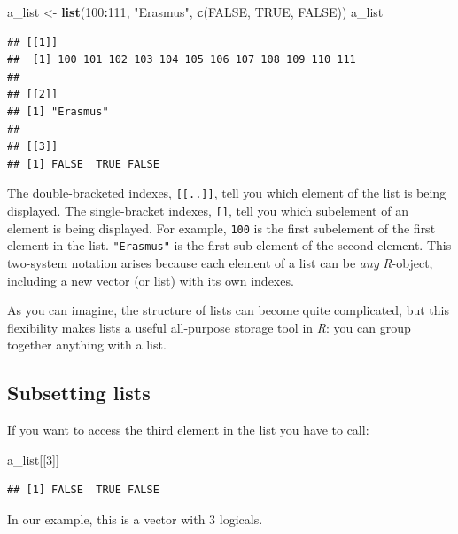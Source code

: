 \documentclass[
]{scrartcl}
\newenvironment{Shaded}{\begin{snugshade}}{\end{snugshade}}
\newcommand{\DecValTok}[1]{\textcolor[rgb]{0.00,0.00,0.81}{#1}}
\newcommand{\KeywordTok}[1]{\textcolor[rgb]{0.13,0.29,0.53}{\textbf{#1}}}
\newcommand{\NormalTok}[1]{#1}
\newcommand{\OperatorTok}[1]{\textcolor[rgb]{0.81,0.36,0.00}{\textbf{#1}}}
\newcommand{\OtherTok}[1]{\textcolor[rgb]{0.56,0.35,0.01}{#1}}
\newcommand{\StringTok}[1]{\textcolor[rgb]{0.31,0.60,0.02}{#1}}
\begin{document}
\begin{Shaded}
\begin{Highlighting}[]
\NormalTok{a\_list \textless{}{-}}\StringTok{ }\KeywordTok{list}\NormalTok{(}\DecValTok{100}\OperatorTok{:}\DecValTok{111}\NormalTok{, }\StringTok{"Erasmus"}\NormalTok{, }\KeywordTok{c}\NormalTok{(}\OtherTok{FALSE}\NormalTok{, }\OtherTok{TRUE}\NormalTok{, }\OtherTok{FALSE}\NormalTok{))}
\NormalTok{a\_list}
\end{Highlighting}
\end{Shaded}

\begin{verbatim}
## [[1]]
##  [1] 100 101 102 103 104 105 106 107 108 109 110 111
## 
## [[2]]
## [1] "Erasmus"
## 
## [[3]]
## [1] FALSE  TRUE FALSE
\end{verbatim}

The double-bracketed indexes, \texttt{{[}{[}..{]}{]}}, tell you which element of the list is being displayed. The single-bracket indexes, \texttt{{[}{]}}, tell you which subelement of an element is being displayed. For example, \texttt{100} is the first subelement of the first element in the list. \texttt{"Erasmus"} is the first sub-element of the second element. This two-system notation arises because each element of a list can be \emph{any} \emph{R}-object, including a new vector (or list) with its own indexes.

As you can imagine, the structure of lists can become quite complicated, but this flexibility makes lists a useful all-purpose storage tool in \emph{R}: you can group together anything with a list.

\hypertarget{subsetting-lists}{%
\subsection{Subsetting lists}\label{subsetting-lists}}

If you want to access the third element in the list you have to call:

\begin{Shaded}
\begin{Highlighting}[]
\NormalTok{a\_list[[}\DecValTok{3}\NormalTok{]]}
\end{Highlighting}
\end{Shaded}

\begin{verbatim}
## [1] FALSE  TRUE FALSE
\end{verbatim}

In our example, this is a vector with 3 logicals.
\end{document}
